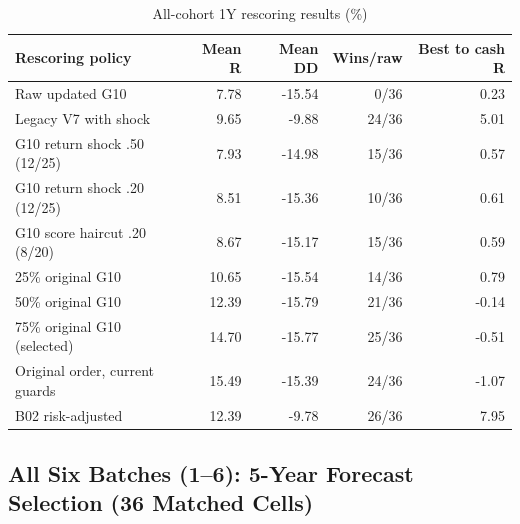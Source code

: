 \documentclass[11pt,a4paper]{article}
\numberwithin{table}{section}
\begin{document}
\begin{minipage}{\linewidth}
\begin{center}\small\setlength{\tabcolsep}{3pt}\renewcommand{\arraystretch}{1.18}
\begin{longtable}{@{}p{.43\linewidth}rrrr@{}}
\caption{All-cohort 1Y rescoring results (\%)}\\
\toprule
Rescoring policy & Mean R & Mean DD & Wins/raw & Best to cash R\\\midrule\endhead
Raw updated G10 & 7.78 & -15.54 & 0/36 & 0.23\\
Legacy V7 with shock & 9.65 & -9.88 & 24/36 & 5.01\\
G10 return shock .50 (12/25) & 7.93 & -14.98 & 15/36 & 0.57\\
G10 return shock .20 (12/25) & 8.51 & -15.36 & 10/36 & 0.61\\
G10 score haircut .20 (8/20) & 8.67 & -15.17 & 15/36 & 0.59\\
25\% original G10 & 10.65 & -15.54 & 14/36 & 0.79\\
50\% original G10 & 12.39 & -15.79 & 21/36 & -0.14\\
75\% original G10 (selected) & 14.70 & -15.77 & 25/36 & -0.51\\
Original order, current guards & 15.49 & -15.39 & 24/36 & -1.07\\
B02 risk-adjusted & 12.39 & -9.78 & 26/36 & 7.95\\
\bottomrule\end{longtable}\end{center}
\end{minipage}\par
\subsection{All Six Batches (1--6): 5-Year Forecast Selection (36 Matched Cells)}
\end{document}
